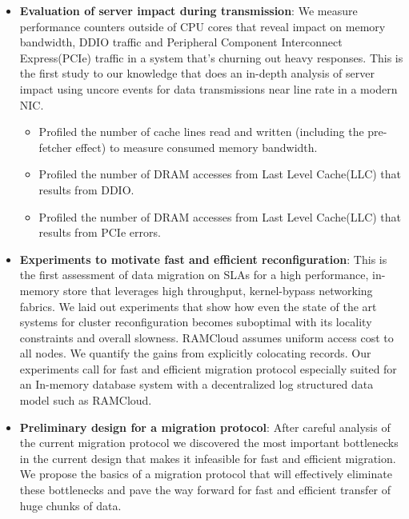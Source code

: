 \begin{itemize}
    \item{\textbf{Evaluation of server impact during transmission}}: We measure performance counters outside of CPU cores that reveal impact on memory bandwidth,
     DDIO traffic and Peripheral Component Interconnect Express(PCIe) traffic in a system that's churning out heavy responses. This is the first study to our knowledge that does an 
     in-depth analysis of server impact using uncore events for data transmissions near line rate in a modern NIC.
     \begin{itemize}
     \item Profiled the number of cache lines read and written (including the pre-fetcher effect) to measure consumed memory bandwidth.
     \item Profiled the number of DRAM accesses from Last Level Cache(LLC) that results from DDIO.
     \item Profiled the number of DRAM accesses from Last Level Cache(LLC) that results from PCIe errors.
     \end{itemize}


  \item{\textbf{Experiments to motivate fast and efficient reconfiguration}}: This is the first assessment of data migration on SLAs for a high performance,
    in-memory store that leverages high throughput, kernel-bypass networking fabrics. 
   We laid out experiments that show how even the state of the art systems for cluster reconfiguration becomes suboptimal with its locality constraints and overall slowness. 
   RAMCloud assumes uniform access cost to all nodes. We quantify the gains from explicitly colocating records.
   Our experiments call for fast and efficient migration protocol especially suited for an In-memory database system with a decentralized log structured data model such as RAMCloud.

  \item{\textbf{Preliminary design for a migration protocol}}: After careful analysis of the current migration protocol
   we discovered the most important bottlenecks in the current design that makes it infeasible for fast and efficient migration.
   We propose the basics of a migration protocol that will effectively eliminate these bottlenecks and pave the way
   forward for fast and efficient transfer of huge chunks of data.

\end{itemize}

